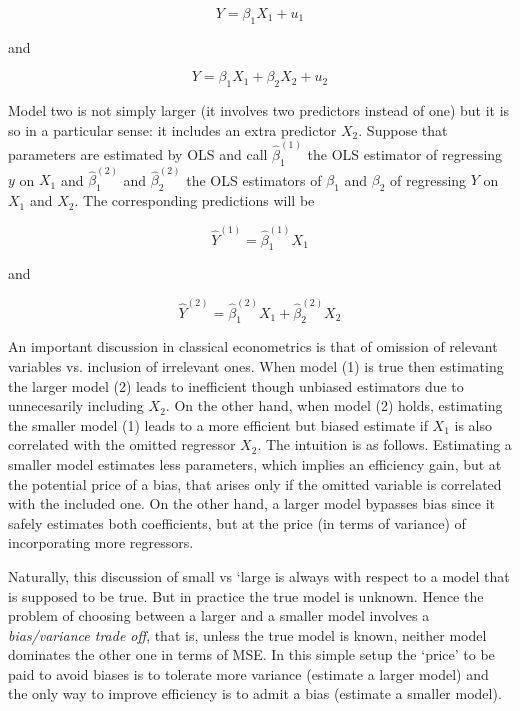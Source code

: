 \begin{equation}\label{eq:3_2_1}
Y=\beta_1 X_1 + u_1
\end{equation}

and

\begin{equation}\label{eq:3_2_2}
Y=\beta_1 X_1 + \beta_2 X_2 + u_2
\end{equation}

Model two is not simply larger (it involves two predictors instead of one) but it is so in a particular sense: it includes an extra predictor $X_2$. Suppose that parameters are estimated by OLS and call $\hat \beta^{(1)}_1$ the OLS estimator of regressing $y$ on $X_1$ and $\hat \beta^{(2)}_1$ and $\hat \beta^{(2)}_2$ the OLS estimators of $\beta_1$ and $\beta_2$ of regressing $Y$ on $X_1$ and $X_2$. The corresponding predictions will be

\begin{equation}\label{eq:3_2_3}
\hat{Y}^{(1)}=\hat{\beta}^{(1)}_1 X_1 
\end{equation}

and

\begin{equation}\label{eq:3_2_4}
\hat{Y}^{(2)}=\hat{\beta}^{(2)}_1 X_1 + \hat{\beta}^{(2)}_2 X_2 
\end{equation}


An important discussion in classical econometrics is that of omission of relevant variables vs. inclusion of irrelevant ones. When model (1) is true then estimating the larger model (2) leads to inefficient though unbiased estimators due to unnecesarily including $X_2$. On the other hand, when model (2) holds, estimating the smaller model (1) leads to a more efficient but biased estimate if $X_1$ is also correlated with the omitted regressor $X_2$. The intuition is as follows. Estimating a smaller model estimates less parameters, which implies an efficiency gain, but at the potential price of a bias, that arises only if the omitted variable is correlated with the included one. On the other hand, a larger model bypasses bias since it safely estimates both coefficients, but at the price (in terms of variance) of incorporating more regressors.

Naturally, this discussion of small vs `large is always with respect to a model that is supposed to be true. But in practice the true model is unknown. Hence the problem of choosing between a larger and a smaller model involves a {\it bias/variance trade off}, that is, unless the true model is known, neither model dominates the other one in terms of MSE. In this simple setup the `price' to be paid to avoid biases is to tolerate more variance (estimate a larger model) and the only way to improve efficiency is to admit a bias (estimate a smaller model).

